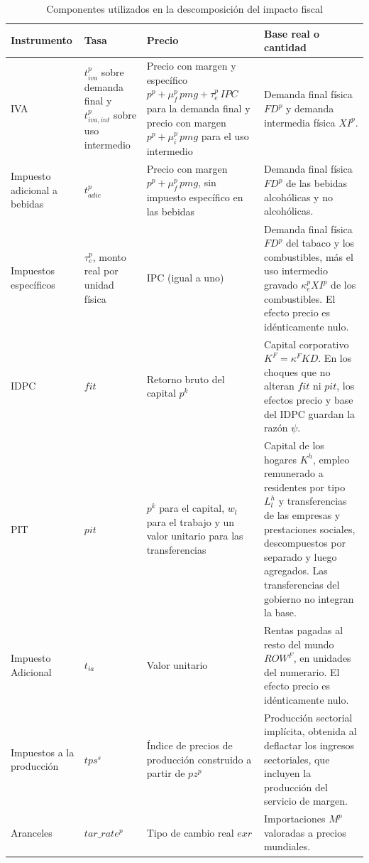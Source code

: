 \documentclass[11pt]{article}
\begin{document}
\begin{table}[H]
\centering
\caption{Componentes utilizados en la descomposición del impacto fiscal}
\label{tab:descomposicion-fiscal}
\small
\begin{tabular}{|p{2.4cm}|p{2.2cm}|p{3.2cm}|p{5.9cm}|}
  \hline
  Instrumento & Tasa & Precio & Base real o cantidad \\
  \hline
  IVA & \(t_{iva}^p\) sobre demanda final y \(t_{iva,int}^p\) sobre uso intermedio & Precio con margen y específico \(p^p+\mu_f^p\,pmg+\tau_e^p\,IPC\) para la demanda final y precio con margen \(p^p+\mu_i^p\,pmg\) para el uso intermedio & Demanda final física \(FD^p\) y demanda intermedia física \(XI^p\). \\
  \hline
  Impuesto adicional a bebidas & \(t_{adic}^p\) & Precio con margen \(p^p+\mu_f^p\,pmg\), sin impuesto específico en las bebidas & Demanda final física \(FD^p\) de las bebidas alcohólicas y no alcohólicas. \\
  \hline
  Impuestos específicos & \(\tau_e^p\), monto real por unidad física & IPC (igual a uno) & Demanda final física \(FD^p\) del tabaco y los combustibles, más el uso intermedio gravado \(\kappa_e^p XI^p\) de los combustibles. El efecto precio es idénticamente nulo. \\
  \hline
  IDPC & \(fit\) & Retorno bruto del capital \(p^k\) & Capital corporativo \(K^F=\kappa^F KD\). En los choques que no alteran $fit$ ni $pit$, los efectos precio y base del IDPC guardan la razón \(\psi\). \\
  \hline
  PIT & \(pit\) & \(p^k\) para el capital, \(w_l\) para el trabajo y un valor unitario para las transferencias & Capital de los hogares \(K^h\), empleo remunerado a residentes por tipo \(L^{h}_{l}\) y transferencias de las empresas y prestaciones sociales, descompuestos por separado y luego agregados. Las transferencias del gobierno no integran la base. \\
  \hline
  Impuesto Adicional & \(t_{ia}\) & Valor unitario & Rentas pagadas al resto del mundo \(ROW^F\), en unidades del numerario. El efecto precio es idénticamente nulo. \\
  \hline
  Impuestos a la producción & \(tps^s\) & Índice de precios de producción construido a partir de \(pz^p\) & Producción sectorial implícita, obtenida al deflactar los ingresos sectoriales, que incluyen la producción del servicio de margen. \\
  \hline
  Aranceles & \(tar\_rate^p\) & Tipo de cambio real \(exr\) & Importaciones \(M^p\) valoradas a precios mundiales. \\
  \hline
\end{tabular}
\end{table}
\end{document}
